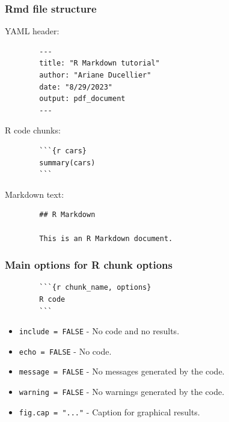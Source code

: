 \documentclass{beamer}
\begin{document}
	\begin{frame}[fragile]
		\frametitle{Rmd file structure}

		YAML header:

		\begin{exampleblock}{}
		\begin{BVerbatim}
		---
		title: "R Markdown tutorial"
		author: "Ariane Ducellier"
		date: "8/29/2023"
		output: pdf_document
		---
		\end{BVerbatim}
		\end{exampleblock}{}

		R code chunks:
		
		\begin{exampleblock}{}
		\begin{BVerbatim}
		```{r cars}
		summary(cars)
		```
		\end{BVerbatim}
		\end{exampleblock}{}

		Markdown text:

		\begin{exampleblock}{}
		\begin{BVerbatim}
		## R Markdown

		This is an R Markdown document.
		\end{BVerbatim}
		\end{exampleblock}{}

	\end{frame}

	\begin{frame}[fragile]
		\frametitle{Main options for R chunk options}

		\begin{exampleblock}{}
		\begin{BVerbatim}
		```{r chunk_name, options}
		R code
		```
		\end{BVerbatim}
		\end{exampleblock}{}

		\vspace{1em}

		\begin{itemize}
			\item \verb|include = FALSE| - No code and no results.
			\item \verb|echo = FALSE| - No code.
			\item \verb|message = FALSE| - No messages generated by the code.
			\item \verb|warning = FALSE| - No warnings generated by the code.
			\item \verb|fig.cap = "..."| - Caption for graphical results.
		\end{itemize}

	\end{frame}
\end{document}
